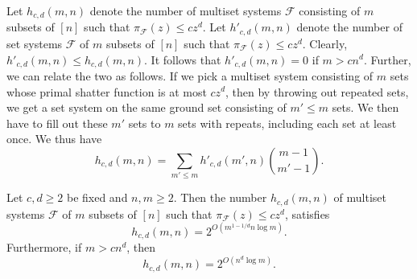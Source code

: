 \documentclass[10pt,a4paper]{amsart}
\begin{document}
Let $h_{c,d}(m,n)$ denote the number of multiset systems $\mathcal{F}$ consisting of $m$ subsets of $[n]$ such that $\pi_{\mathcal{F}}(z) \leq cz^d$.   Let $h'_{c,d}(m,n)$ denote the number of set systems $\mathcal{F}$ of $m$ subsets of $[n]$ such that $\pi_{\mathcal{F}}(z) \leq cz^d$.  Clearly, $h'_{c,d}(m,n) \leq h_{c,d}(m,n)$.  It follows that $h'_{c,d}(m,n)=0$ if $m > cn^d$. Further, we can relate the two as follows. If we pick a multiset system consisting of $m$ sets whose primal shatter function is at most $cz^d$, then by throwing out repeated sets, we get a set system on the same ground set consisting of $m' \leq m$ sets. We then have to fill out these $m'$ sets to $m$ sets with repeats, including each set at least once. We thus have \begin{equation}\label{hfromh'} h_{c,d}(m,n)=\sum_{m' \leq m}h'_{c,d}(m',n){m-1 \choose m'-1}.
 \end{equation}

\begin{theorem}\label{vc}
Let $c,d \geq 2$ be fixed and $n,m \geq 2$. Then the number $h_{c,d}(m,n)$ of multiset systems $\mathcal{F}$ of $m$ subsets of $[n]$ such that $\pi_{\mathcal{F}}(z) \leq cz^d$,  satisfies $$h_{c,d}(m,n) = 2^{O(m^{1-1/d}n\log m)}.$$ Furthermore, if $m > cn^d$, then $$h_{c,d}(m,n)=2^{O(n^d\log m)}.$$
 \end{theorem}
\end{document}
